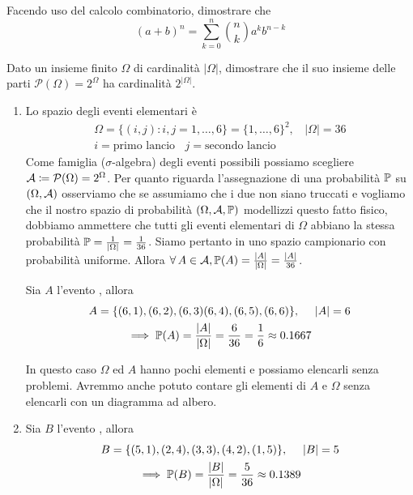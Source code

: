 \Esercizio{}

Facendo uso del calcolo combinatorio, dimostrare che
\begin{equation*}
	(a+b)^{n} =\sum\limits_{k=0}^{n}\binom{n}{k} a^{k} b^{n-k}
\end{equation*}

\Esercizio{}

Dato un insieme finito $\Omega $ di cardinalità $|\Omega| $, dimostrare che il suo insieme delle parti $\mathcal{P}(\Omega) =2^{\Omega }$ ha cardinalità $2^{|\Omega| }$.

\ParteSoluzioni

\Soluzione

\begin{enumerate}
	\item Lo spazio degli eventi elementari è
	\begin{gather*}
		\Omega =\{(i,j) :i,j=1,\dots ,6\} =\{1,\dots ,6\}^{2} ,\ \ \ \ |\Omega| =36\\
		i=\text{primo lancio} \ \ \ \ j=\text{secondo lancio}
	\end{gather*}
	Come famiglia ($\sigma $-algebra) degli eventi possibili possiamo scegliere $\mathcal{A} \coloneqq \mathcal{P}(\Omega) =2^{\Omega }$. Per quanto riguarda l'assegnazione di una probabilità $\mathbb{P}$ su $(\Omega ,\mathcal{A})$ osserviamo che se assumiamo che i due non siano truccati e vogliamo che il nostro spazio di probabilità $(\Omega,\mathcal{A},\mathbb{P})$ modellizzi questo fatto fisico, dobbiamo ammettere che tutti gli eventi elementari di $\Omega $ abbiano la stessa probabilità $\mathbb{P} =\frac{1}{|\Omega| } =\frac{1}{36}$. Siamo pertanto in uno spazio campionario con probabilità uniforme. Allora $\forall A\in \Ac ,\PP(A) =\frac{| A| }{|\Omega| } =\frac{| A| }{36}$.

	Sia $A$ l'evento , allora
	\begin{gather*}
		A=\{(6,1) ,(6,2) ,(6,3)(6,4) ,(6,5) ,(6,6)\} ,\ \ \ \ |A| =6\\
		\implies \mathbb{P}(A) =\frac{| A| }{|\Omega| } =\frac{6}{36} =\frac{1}{6} \approx 0.1667
	\end{gather*}

	\begin{rem}
		In questo caso $\Omega $ ed $A$ hanno pochi elementi e possiamo elencarli senza problemi. Avremmo anche potuto contare gli elementi di $A$ e $\Omega $ senza elencarli con un diagramma ad albero.
	\end{rem}

	\item Sia $B$ l'evento , allora
	\begin{gather*}
		B=\{(5,1) ,(2,4) ,(3,3) ,(4,2) ,(1,5)\} ,\ \ \ \ |B| =5\\
		\implies \mathbb{P}(B) =\frac{| B| }{|\Omega| } =\frac{5}{36} \approx 0.1389
	\end{gather*}


\end{enumerate}
